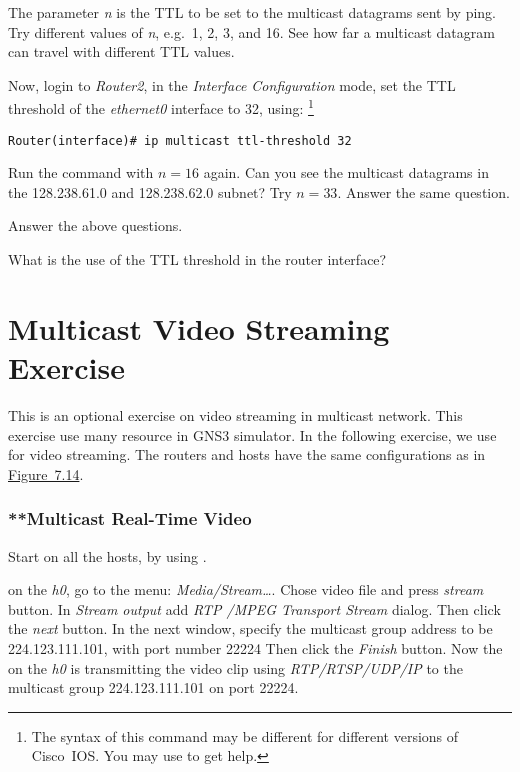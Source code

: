 \documentclass{../UTNetLab}
\begin{document}
    The parameter \textit{n} is the TTL to be set to the multicast datagrams sent by ping.
    Try different values of \textit{n}, e.g.\ 1, 2, 3, and 16.
    See how far a multicast datagram can travel with different TTL values.

    Now, login to \textit{Router2}, in the \textit{Interface Configuration} mode, set the TTL threshold of the \textit{ethernet0} interface to 32, using: 
    \footnote{The syntax of this command may be different for different versions of Cisco~IOS.
    You may use  to get help.}
    \begin{lstlisting}[language={cisco}]    
Router(interface)# ip multicast ttl-threshold 32
    \end{lstlisting}

    Run the  command with $n = 16$ again.
    Can you see the multicast datagrams in the 128.238.61.0 and 128.238.62.0 subnet?
    Try $n = 33$.
    Answer the same question.
    
    \begin{report}
        \item Answer the above questions.
        
        \item What is the use of the TTL threshold in the router interface?
    \end{report}

\part{Multicast Video Streaming Exercise}
    This is an optional exercise on video streaming in multicast network.
    This exercise use many resource in GNS3 simulator.
    In the following exercise, we use  for video streaming.
    The routers and hosts have the same configurations as in \hyperref[fig:7.14]{Figure~7.14}.

\section{**Multicast Real-Time Video}
    Start  on all the hosts, by using .

    on the \textit{h0}, go to the  menu: \textit{Media/Stream\ldots }.
    Chose video file  and press \textit{stream} button.
    In \textit{Stream output} add \textit{RTP /MPEG Transport Stream} dialog.
    Then click the \textit{next} button.
    In the next window, specify the multicast group address to be {224.123.111.101}, with port number {22224} %
    Then click the \textit{Finish} button.
    Now the  on the \textit{h0} is transmitting the video clip using \textit{RTP/RTSP/UDP/IP} to the multicast group {224.123.111.101} on port {22224}.
\end{document}
